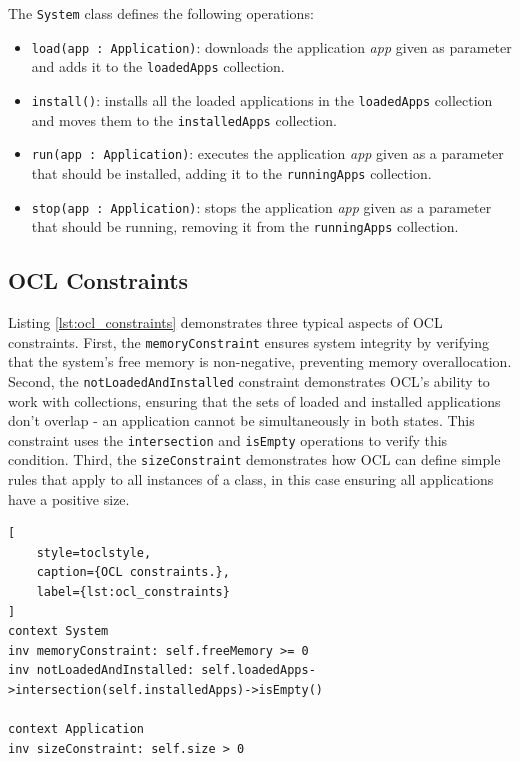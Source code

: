 The \texttt{System} class defines the following operations:
\begin{itemize}
    \setlength{\itemsep}{0pt}
    \setlength{\parskip}{0pt}
    \setlength{\parsep}{0pt}
    \item \texttt{load(app : Application)}: downloads the application \textit{app} given as parameter and adds it to the \texttt{loadedApps} collection.
    \item \texttt{install()}: installs all the loaded applications in the \texttt{loadedApps} collection and moves them to the \texttt{installedApps} collection.
    \item \texttt{run(app : Application)}: executes the application \textit{app} given as a parameter that should be installed, adding it to the \texttt{runningApps} collection.
    \item \texttt{stop(app : Application)}: stops the application \textit{app} given as a parameter that should be running, removing it from the \texttt{runningApps} collection.
\end{itemize}

\subsection{OCL Constraints}

Listing \ref{lst:ocl_constraints} demonstrates three typical aspects of OCL constraints. 
First, the \texttt{memoryConstraint} ensures system integrity by verifying that the 
system's free memory is non-negative, preventing memory overallocation. 
Second, the \texttt{notLoadedAndInstalled} constraint demonstrates OCL's ability to work with 
collections, ensuring that the sets of loaded and installed applications don't overlap - 
an application cannot be simultaneously in both states. This constraint uses the 
\texttt{intersection} and \texttt{isEmpty} operations to verify this condition.
Third, the \texttt{sizeConstraint} demonstrates how OCL can define 
simple rules that apply to all instances of a class, in this case ensuring all 
applications have a positive size.

\begin{lstlisting}[
    style=toclstyle, 
    caption={OCL constraints.}, 
    label={lst:ocl_constraints}
]
context System
inv memoryConstraint: self.freeMemory >= 0
inv notLoadedAndInstalled: self.loadedApps->intersection(self.installedApps)->isEmpty()

context Application
inv sizeConstraint: self.size > 0
\end{lstlisting}

